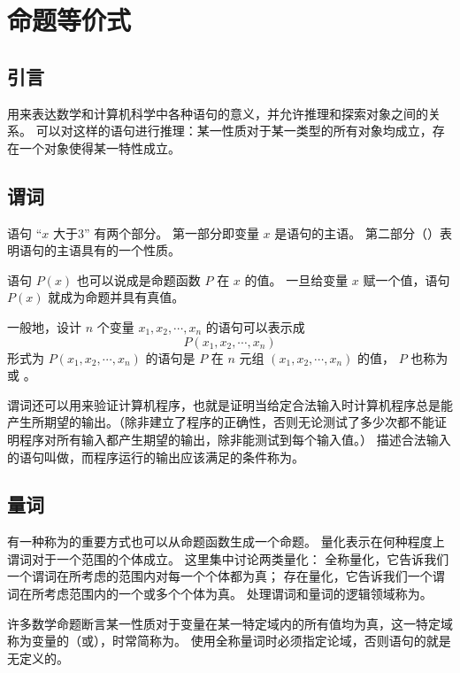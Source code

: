 
\section{命题等价式}
{
    \subsection{引言}
    {
        用来表达数学和计算机科学中各种语句的意义，并允许推理和探索对象之间的关系。
        可以对这样的语句进行推理：某一性质对于某一类型的所有对象均成立，存在一个对象使得某一特性成立。
    }

    \subsection{谓词}
    {
        语句 ``$x$ 大于3'' 有两个部分。
        第一部分即变量 $x$ 是语句的主语。
        第二部分（）表明语句的主语具有的一个性质。

        语句 $P(x)$ 也可以说成是命题函数 $P$ 在 $x$ 的值。
        一旦给变量 $x$ 赋一个值，语句 $P(x)$ 就成为命题并具有真值。

        一般地，设计 $n$ 个变量 $x_1, x_2, \cdots, x_n$ 的语句可以表示成
        $$P(x_1, x_2, \cdots, x_n)$$
        形式为 $P(x_1, x_2, \cdots, x_n)$ 的语句是  $P$ 在 $n$ 元组 $(x_1, x_2, \cdots, x_n)$ 的值， $P$ 也称为 或 。 

        {
            谓词还可以用来验证计算机程序，也就是证明当给定合法输入时计算机程序总是能产生所期望的输出。（除非建立了程序的正确性，否则无论测试了多少次都不能证明程序对所有输入都产生期望的输出，除非能测试到每个输入值。）
            描述合法输入的语句叫做，而程序运行的输出应该满足的条件称为。
        }
    }

    \subsection{量词}
    {
        有一种称为的重要方式也可以从命题函数生成一个命题。
        量化表示在何种程度上谓词对于一个范围的个体成立。
        这里集中讨论两类量化：
        全称量化，它告诉我们一个谓词在所考虑的范围内对每一个个体都为真；
        存在量化，它告诉我们一个谓词在所考虑范围内的一个或多个个体为真。
        处理谓词和量词的逻辑领域称为。

        {
            许多数学命题断言某一性质对于变量在某一特定域内的所有值均为真，这一特定域称为变量的（或），时常简称为。
            使用全称量词时必须指定论域，否则语句的就是无定义的。

}}}
